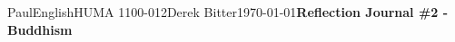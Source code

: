 \documentclass[12pt,letterpaper]{article}
\begin{document}
\begin{mla}{Paul}{English}{HUMA 1100-012}{Derek Bitter}{\today}{\textbf{Reflection Journal \#2 - Buddhism}}




% 
%    
%





\end{mla}
\end{document}
